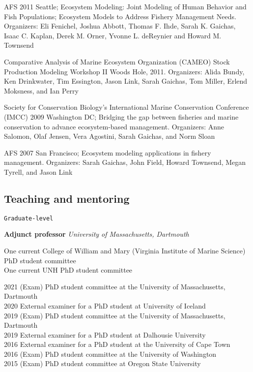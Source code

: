 \documentclass[11pt, a4paper]{awesome-cv}
\begin{document}
AFS 2011 Seattle; Ecosystem Modeling: Joint Modeling of Human Behavior
and Fish Populations; Ecosystem Models to Address Fishery Management
Needs. Organizers: Eli Fenichel, Joshua Abbott, Thomas F. Ihde, Sarah K.
Gaichas, Isaac C. Kaplan, Derek M. Orner, Yvonne L. deReynier and Howard
M. Townsend

Comparative Analysis of Marine Ecosystem Organization (CAMEO) Stock
Production Modeling Workshop II Woods Hole, 2011. Organizers: Alida
Bundy, Ken Drinkwater, Tim Essington, Jason Link, Sarah Gaichas, Tom
Miller, Erlend Moksness, and Ian Perry

Society for Conservation Biology's International Marine Conservation
Conference (IMCC) 2009 Washington DC; Bridging the gap between fisheries
and marine conservation to advance ecosystem-based management.
Organizers: Anne Salomon, Olaf Jensen, Vera Agostini, Sarah Gaichas, and
Norm Sloan

AFS 2007 San Francisco; Ecosystem modeling applications in fishery
management. Organizers: Sarah Gaichas, John Field, Howard Townsend,
Megan Tyrell, and Jason Link

\hypertarget{teaching-and-mentoring}{%
\subsection{Teaching and mentoring}\label{teaching-and-mentoring}}

\begin{verbatim}
Graduate-level
\end{verbatim}

\textbf{Adjunct professor} \emph{University of Massachusetts, Dartmouth}

One current College of William and Mary (Virginia Institute of Marine
Science) PhD student committee\\
One current UNH PhD student committee

2021 (Exam) PhD student committee at the University of Massachusetts,
Dartmouth\\
2020 External examiner for a PhD student at University of Iceland\\
2019 (Exam) PhD student committee at the University of Massachusetts,
Dartmouth\\
2019 External examiner for a PhD student at Dalhousie University\\
2016 External examiner for a PhD student at the University of Cape
Town\\
2016 (Exam) PhD student committee at the University of Washington\\
2015 (Exam) PhD student committee at Oregon State University
\end{document}
